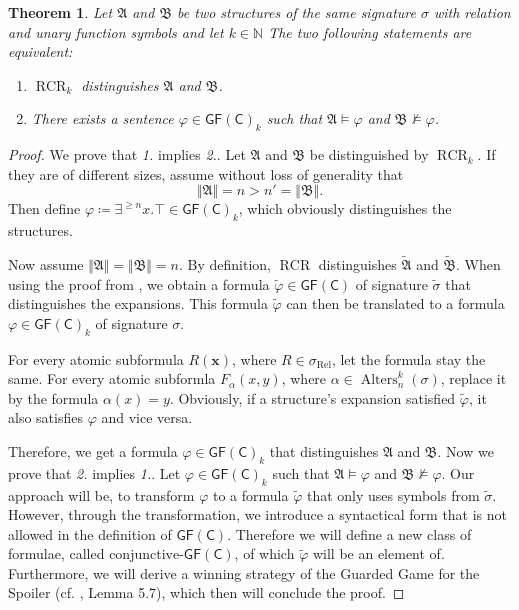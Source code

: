 \documentclass[a4paper,11pt,DIV=15]{scrartcl} %
\renewcommand{\phi}{\varphi}
\theoremstyle{plain}
\newtheorem{theorem}{Theorem}
\theoremstyle{definition}
\newcommand{\GFC}{\mathsf{GF}(\mathsf{C})}
\newcommand{\RCR}{\operatorname{RCR}}
\begin{document}
\begin{theorem}
	Let $\mathfrak A$ and $\mathfrak B$ be two structures of the same signature $\sigma$ with relation and unary function symbols and let $k\in \mathbb{N}$
	The two following statements are equivalent:
	\begin{enumerate}
		\item $\RCR_k$ distinguishes $\mathfrak A$ and $\mathfrak B$.
		\item There exists a sentence $\phi\in\GFC_k$ such that $\mathfrak A\models \phi$ and $\mathfrak B\not\models \phi$.
	\end{enumerate}
\end{theorem}
\begin{proof}
	We prove that \emph{1.} implies \emph{2.}. 
	Let $\mathfrak A$ and $\mathfrak B$ be distinguished by $\RCR_k$.
	If they are of different sizes, assume without loss of generality that 
	$$\Vert \mathfrak A \Vert =n > n'=\Vert \mathfrak B \Vert.$$
	Then define $\phi\coloneqq \exists^{\geq n} x. \top\in \GFC_k$, which obviously distinguishes the structures.
	
	Now assume $\Vert \mathfrak A\Vert = \Vert \mathfrak B \Vert = n$.
	By definition, $\RCR$ distinguishes $\widetilde{\mathfrak A}$ and $\widetilde{\mathfrak B}$.
	When using the proof from \cite{scheidt2025ColorRefinement}, we obtain a formula $\widetilde{\phi}\in \GFC$ of signature $\widetilde{\sigma}$ that distinguishes the expansions.
	This formula $\widetilde{\phi}$ can then be translated to a formula $\phi\in\GFC_k$ of signature $\sigma$.
	
	For every atomic subformula $R(\mathbf x)$, where $R\in \sigma_{\operatorname{Rel}}$, let the formula stay the same.
	For every atomic subformla $F_\alpha(x,y)$, where $\alpha\in \operatorname{Alters}_n^k(\sigma)$, replace it by the formula $\alpha(x)=y$. Obviously, if a structure's expansion satisfied $\widetilde{\phi}$, it also satisfies $\phi$ and vice versa.
	
	Therefore, we get a formula $\phi\in \GFC_k$ that distinguishes $\mathfrak A$ and $\mathfrak B$.
	\break
	Now we prove that \emph{2.} implies \emph{1.}.
	Let $\phi\in \GFC_k$ such that $\mathfrak A\models \phi$ and $\mathfrak B\not\models \phi$.
	Our approach will be, to transform $\phi$ to a formula $\widetilde{\phi}$ that only uses symbols from $\widetilde{\sigma}$.
	However, through the transformation, we introduce a syntactical form that is not allowed in the definition of $\GFC$.
	Therefore we will define a new class of formulae, called $\text{conjunctive-}\GFC$, of which $\widetilde{\phi}$ will be an element of.
	Furthermore, we will derive a winning strategy of the Guarded Game for the Spoiler (cf. \cite{scheidt2025ColorRefinement}, Lemma 5.7), which then will conclude the proof.
\end{proof}
\end{document}
